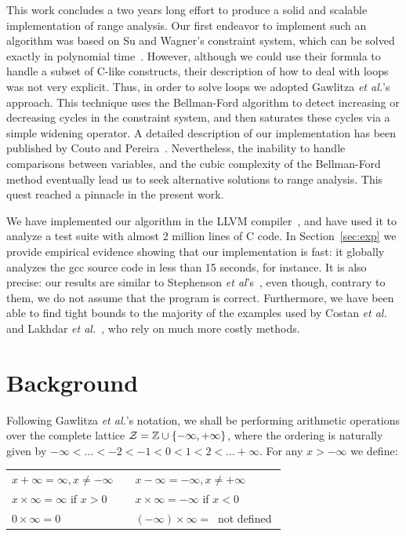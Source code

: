 \documentclass{llncs}
\begin{document}
This work concludes a two years long effort to produce a solid and scalable
implementation of range analysis.
Our first endeavor to implement such an algorithm was based on Su and
Wagner's constraint system, which can be solved exactly in polynomial
time~\cite{Su04,Su05}.
However, although we could use their formula to handle a subset of C-like
constructs, their description of how to deal with loops was
not very explicit.
Thus, in order to solve loops we adopted Gawlitza
{\em et al.}'s~\cite{Gawlitza09} approach.
This technique uses the Bellman-Ford algorithm to detect increasing or
decreasing cycles in the constraint system, and then saturates these cycles
via a simple widening operator.
A detailed description of our implementation has been published by
Couto and Pereira~\cite{Couto11}.
Nevertheless, the inability to handle comparisons between variables, and the
cubic complexity of the Bellman-Ford method eventually lead us to seek
alternative solutions to range analysis.
This quest reached a pinnacle in the present work.

We have implemented our algorithm in the LLVM compiler~\cite{Lattner04}, and
have used it to analyze a test suite with almost 2 million lines of C code.
In Section~\ref{sec:exp} we provide empirical evidence showing that our
implementation is fast: it globally analyzes the gcc source code in less than
15 seconds, for instance.
It is also precise: our results are similar to Stephenson
{\em et al}'s~\cite{Stephenson00}, even though, contrary to them, we do not
assume that the program is correct.
Furthermore, we have been able to find tight bounds to the majority of the
examples used by Costan {\em et al.}~\cite{Costan05} and Lakhdar
{\em et al.}~\cite{Lakhdar11}, who rely on much more costly methods.


\section{Background}
\label{sec:bck}

Following Gawlitza {\em et al.}'s notation, we shall be performing arithmetic
operations over the complete lattice
$\cal{Z} = \mathbb{Z} \cup \{-\infty, +\infty\}$, where the ordering is
naturally given by $-\infty < \ldots < -2 < -1 < 0 < 1 < 2 < \ldots +\infty$.
For any $x > -\infty$ we define:

\begin{tabular}{lcl}
$x + \infty = \infty, x \neq -\infty$ & \mbox{\hspace{0.1cm}} & $x - \infty = - \infty, x \neq +\infty$ \\
$x \times \infty = \infty$ if $x > 0$ & & $x \times \infty = -\infty$ if $x < 0$ \\
$0 \times \infty = 0$ & & $(-\infty) \times \infty = \ $ not defined $$ \\
\end{tabular}
\end{document}
